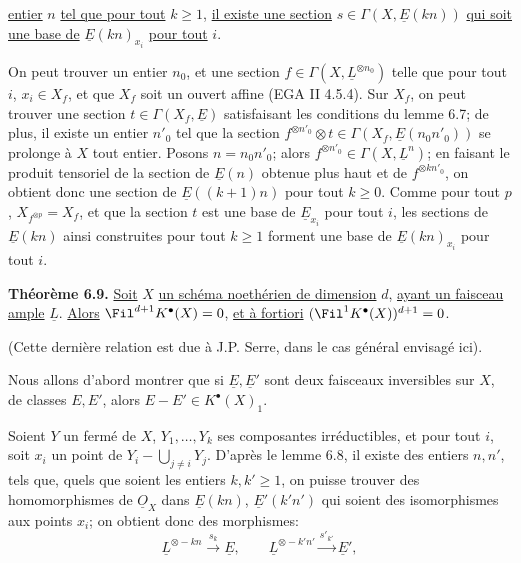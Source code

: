 
\uline{entier} $n$ \uline{tel que pour tout} $k\ge1$, \uline{il existe une section} $s\in\Gamma(X,\underline{E}(kn))$ \uline{qui soit une base de} $\underline{E}(kn)_{x_i}$ \uline{pour tout} $i$.

On peut trouver un entier $n_0$, et une section $f\in\Gamma(X,\underline{L}^{\otimes n_0})$ telle que pour tout $i$, $x_i\in X_f$, et que $X_f$ soit un ouvert affine (EGA II 4.5.4). Sur $X_f$, on peut trouver une section $t\in\Gamma(X_f,\underline{E})$ satisfaisant les conditions du lemme 6.7; de plus, il existe un entier $n'_0$ tel que la section $f^{\otimes n'_0}\otimes t\in\Gamma(X_f,\underline{E}(n_0n'_0))$ se prolonge à $X$ tout entier. Posons $n=n_0n'_0$; alors $f^{\otimes n'_0}\in\Gamma(X,\underline{L}^n)$; en faisant le produit tensoriel de la section de $\underline{E}(n)$ obtenue plus haut et de $f^{\otimes kn'_0}$, on obtient donc une section de $\underline{E}((k+1)n)$ pour tout $k\ge0$. Comme pour tout $p$, $X_{f^{\otimes p}}=X_f$, et que la section $t$ est une base de $\underline{E}_{x_i}$ pour tout $i$, les sections de $\underline{E}(kn)$ ainsi construites pour tout $k\ge1$ forment une base de $\underline{E}(kn)_{x_i}$ pour tout $i$.

\textbf{Théorème 6.9.} \uline{Soit} $X$ \uline{un schéma noethérien de dimension} $d$, \uline{ayant un faisceau ample} $\underline{L}$. \uline{Alors} $\Fil^{d+1}K^{\bullet}(X)=0$, \uline{et à fortiori} $(\Fil^1K^{\bullet}(X))^{d+1}=0$.

(Cette dernière relation est due à J.P. Serre, dans le cas général envisagé ici).

Nous allons d'abord montrer que si $\underline{E},\underline{E}'$ sont deux faisceaux inversibles sur $X$, de classes $E,E'$, alors $E-E'\in K^{\bullet}(X)_1$.

Soient $Y$ un fermé de $X$, $Y_1,\ldots,Y_k$ ses composantes irréductibles, et pour tout $i$, soit $x_i$ un point de $Y_i-\bigcup_{j\ne i}Y_j$. D'après le lemme 6.8, il existe des entiers $n,n'$, tels que, quels que soient les entiers $k,k'\ge1$, on puisse trouver des homomorphismes de $\underline{O}_X$ dans $\underline{E}(kn)$, $\underline{E}'(k'n')$ qui soient des isomorphismes aux points $x_i$; on obtient donc des morphismes:
\[
  \underline{L}^{\otimes -kn}\xrightarrow{s_k} \underline{E},
  \qquad
  \underline{L}^{\otimes -k'n'}\xrightarrow{s'_{k'}} \underline{E}',
\]
